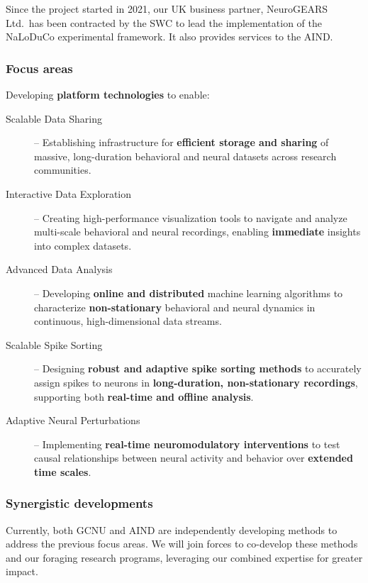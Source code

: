 Since the project started in 2021, our UK business partner, NeuroGEARS Ltd.\
has been contracted by the SWC to lead the implementation of the NaLoDuCo
experimental framework. It also provides services to the AIND.

\subsubsection{Focus areas}

Developing \textbf{platform technologies} to enable:


\begin{description}

    \item[Scalable Data Sharing] – Establishing infrastructure for \textbf{efficient storage and sharing} of massive, long-duration behavioral and neural datasets across research communities.

	\item[Interactive Data Exploration] – Creating high-performance visualization tools to navigate and analyze multi-scale behavioral and neural recordings, enabling \textbf{immediate} insights into complex datasets.

	\item[Advanced Data Analysis] – Developing \textbf{online and distributed} machine learning algorithms to characterize \textbf{non-stationary} behavioral and neural dynamics in continuous, high-dimensional data streams.

	\item[Scalable Spike Sorting] – Designing \textbf{robust and adaptive spike sorting methods} to accurately assign spikes to neurons in \textbf{long-duration, non-stationary recordings}, supporting both \textbf{real-time and offline analysis}.

	\item[Adaptive Neural Perturbations] – Implementing \textbf{real-time neuromodulatory interventions} to test causal relationships between neural activity and behavior over \textbf{extended time scales}.

\end{description}

\subsubsection{Synergistic developments}

Currently, both GCNU and AIND are independently developing methods to address
the previous focus areas. We will join forces to co-develop these methods and
our foraging research programs, leveraging our combined expertise for greater
impact.

